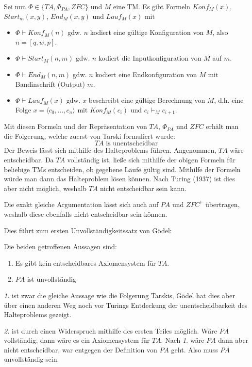 Sei nun $\Phi\in\{TA,\Phi_{PA},ZFC\}$ und $M$ eine TM. Es gibt Formeln $Konf_M(x)$, $Start_m(x,y)$, $End_M(x,y)$ und $Lauf_M(x)$ mit 
\begin{itemize}
	\item $\Phi\vdash Konf_M(n)$ gdw. $n$ kodiert eine gültige Konfiguration von $M$, also $n=[q,w,p]$.
	\item $\Phi\vdash Start_M(n,m)$ gdw. $n$ kodiert die Inputkonfiguration von $M$ auf $m$.
	\item $\Phi\vdash End_M(n,m)$ gdw. $n$ kodiert eine Endkonfiguration von $M$ mit Bandinschrift (Output) $m$.
	\item $\Phi\vdash Lauf_M(x)$ gdw. $x$ beschreibt eine gültige Berechnung von $M$, d.h. eine Folge $x=\langle c_0,\dots,c_n\rangle$ mit $Konf_M(c_i)$ und $c_i\vdash_M c_{i+1}$.
\end{itemize}

Mit diesen Formeln und der Repräsentation von $TA$, $\Phi_{PA}$ und $ZFC$ erhält man die Folgerung, welche zuerst von Tarski formuliert wurde:
$$TA \text{ is unentscheidbar}$$
Der Beweis lässt sich mithilfe des Halteproblems führen. Angenommen, $TA$ wäre entscheidbar. Da $TA$ vollständig ist, ließe sich mithilfe der obigen Formeln für beliebige TMs entscheiden, ob gegebene Läufe gültig sind. Mithilfe der Formeln würde man dann das Halteproblem lösen können. Nach Turing (1937) ist dies aber nicht möglich, weshalb $TA$ nicht entscheidbar sein kann.

Die exakt gleiche Argumentation lässt sich auch auf $PA$ und $ZFC^{\models}$ übertragen, weshalb diese ebenfalls nicht entscheidbar sein können.

Dies führt zum ersten Unvollständigkeitssatz von Gödel:

\begin{satz}
	Die beiden getroffenen Aussagen sind:
	\begin{enumerate}
		\item Es gibt kein entscheidbares Axiomensystem für $TA$.
		\item $PA$ ist unvollständig
	\end{enumerate}
	\label{unvollst1}
\end{satz}

\textit{1.} ist zwar die gleiche Aussage wie die Folgerung Tarskis, Gödel hat dies aber über einen anderen Weg noch vor Turings Entdeckung der unentscheidbarkeit des Halteproblems gezeigt.

\textit{2.} ist durch einen Widerspruch mithilfe des ersten Teiles möglich. Wäre $PA$ vollständig, dann wäre es ein Axiomensystem für $TA$. Nach \textit{1.} wäre $PA$ dann aber nicht entscheidbar, war entgegen der Definition von $PA$ geht. Also muss $PA$ unvollständig sein.


